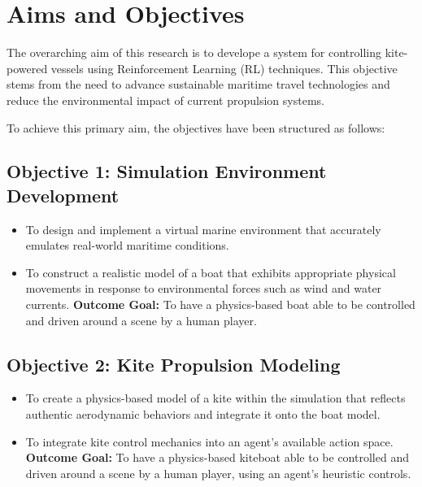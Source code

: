 

\section{Aims and Objectives}

The overarching aim of this research is to develope a system for controlling kite-powered vessels using Reinforcement Learning (RL) techniques. This objective stems from the need to advance sustainable maritime travel technologies and reduce the environmental impact of current propulsion systems.

To achieve this primary aim, the objectives have been structured as follows:

\subsection*{Objective 1: Simulation Environment Development}
\begin{itemize}
    \item To design and implement a virtual marine environment that accurately emulates real-world maritime conditions.
    \item To construct a realistic model of a boat that exhibits appropriate physical movements in response to environmental forces such as wind and water currents.
    \newline\textbf{Outcome Goal:} To have a physics-based boat able to be controlled and driven around a scene by a human player.
\end{itemize}

\subsection*{Objective 2: Kite Propulsion Modeling}
\begin{itemize}
    \item To create a physics-based model of a kite within the simulation that reflects authentic aerodynamic behaviors and integrate it onto the boat model.
    \item To integrate kite control mechanics into an agent’s available action space.
    \newline\textbf{Outcome Goal:} To have a physics-based kiteboat able to be controlled and driven around a scene by a human player, using an agent's heuristic controls.
\end{itemize}

